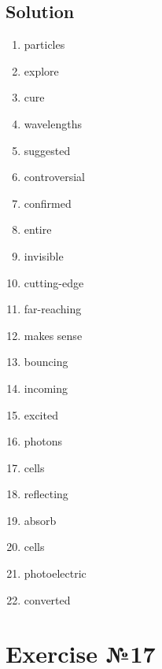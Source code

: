 \subsection*{Solution}
\begin{enumerate}
      \item particles
      \item explore
      \item cure
      \item wavelengths
      \item suggested
      \item controversial
      \item confirmed
      \item entire
      \item invisible
      \item cutting-edge
      \item far-reaching
      \item makes sense
      \item bouncing
      \item incoming
      \item excited
      \item photons
      \item cells
      \item reflecting
      \item absorb
      \item cells
      \item photoelectric
      \item converted
\end{enumerate}

\section*{Exercise №17}
